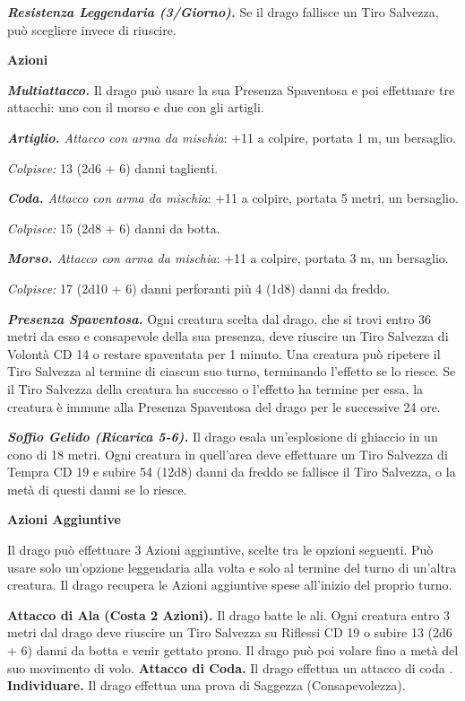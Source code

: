\begin{multicols}{2}
\emph{\textbf{Resistenza Leggendaria (3/Giorno).}} Se il drago fallisce un Tiro Salvezza, può scegliere invece di riuscire. 

\textbf{Azioni}

\emph{\textbf{Multiattacco.}} Il drago può usare la sua Presenza Spaventosa e poi effettuare tre attacchi: uno con il morso e due con gli artigli.

\emph{\textbf{Artiglio.} Attacco con arma da mischia}: +11 a colpire, portata 1 m, un bersaglio.

\emph{Colpisce:} 13 (2d6 + 6) danni taglienti.

\emph{\textbf{Coda.} Attacco con arma da mischia}: +11 a colpire, portata 5 metri, un bersaglio.

\emph{Colpisce:} 15 (2d8 + 6) danni da botta.

\emph{\textbf{Morso.} Attacco con arma da mischia}: +11 a colpire, portata 3 m, un bersaglio.

\emph{Colpisce:} 17 (2d10 + 6) danni perforanti più 4 (1d8) danni da freddo.

\emph{\textbf{Presenza Spaventosa.}} Ogni creatura scelta dal drago, che si trovi entro 36 metri da esso e consapevole della sua presenza, deve riuscire un Tiro Salvezza di Volontà CD 14 o restare spaventata per 1 minuto. Una creatura può ripetere il Tiro Salvezza al termine di ciascun suo turno, terminando l'effetto se lo riesce. Se il Tiro Salvezza della creatura ha successo o l'effetto ha termine per essa, la creatura è immune alla Presenza Spaventosa del drago per le successive 24 ore.

\emph{\textbf{Soffio Gelido (Ricarica 5-6).}} Il drago esala un'esplosione di ghiaccio in un cono di 18 metri. Ogni creatura in quell'area deve effettuare un Tiro Salvezza di Tempra CD 19 e subire 54 (12d8) danni da freddo se fallisce il Tiro Salvezza, o la metà di questi danni se lo riesce. 

\textbf{Azioni Aggiuntive}

Il drago può effettuare 3 Azioni aggiuntive, scelte tra le opzioni seguenti. Può usare solo un'opzione leggendaria alla volta e solo al termine del turno di un'altra creatura. Il drago recupera le Azioni aggiuntive spese all'inizio del proprio turno.

\textbf{Attacco di Ala (Costa 2 Azioni).} Il drago batte le ali. Ogni creatura entro 3 metri dal drago deve riuscire un Tiro Salvezza su Riflessi CD 19 o subire 13 (2d6 + 6) danni da botta e venir gettato prono. Il drago può poi volare fino a metà del suo movimento di volo. \textbf{Attacco di Coda.} Il drago effettua un attacco di coda 
.
\textbf{Individuare.} Il drago effettua una prova di Saggezza (Consapevolezza).


\end{multicols}

